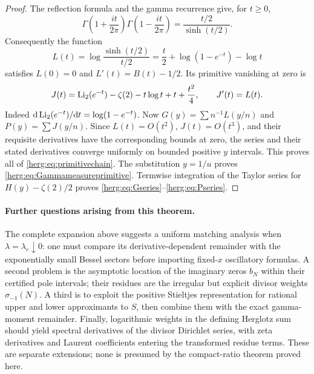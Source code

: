 \begin{proof}
The reflection formula and the gamma recurrence
\cite[\S5.5]{herg:DLMFgamma} give, for $t\geq0$,
\[
 \Gamma\left(1+\frac{it}{2\pi}\right)
 \Gamma\left(1-\frac{it}{2\pi}\right)
     =\frac{t/2}{\sinh(t/2)}.
\]
Consequently the function
\[
 L(t)=\log\frac{\sinh(t/2)}{t/2}
      =\frac t2+\log(1-e^{-t})-\log t
\]
satisfies $L(0)=0$ and $L'(t)=B(t)-1/2$. Its primitive vanishing
at zero is
\[
 J(t)=\operatorname{Li}_2(e^{-t})-\zeta(2)-t\log t+t+\frac{t^2}4,
 \qquad J'(t)=L(t).
\]
Indeed $\mathrm d\operatorname{Li}_2(e^{-t})/\mathrm dt=\log(1-e^{-t})$.
Now $G(y)=\sum n^{-1}L(y/n)$ and $P(y)=\sum J(y/n)$.
Since $L(t)=O(t^2)$, $J(t)=O(t^3)$, and their requisite
derivatives have the corresponding bounds at zero, the series and
their stated derivatives converge uniformly on bounded positive
$y$ intervals. This proves all of \eqref{herg:eq:primitivechain}.
The substitution $y=1/u$ proves
\eqref{herg:eq:Gammameasureprimitive}. Termwise integration of the
Taylor series for $H(y)-\zeta(2)/2$ proves
\eqref{herg:eq:Gseries}--\eqref{herg:eq:Pseries}.
\end{proof}

\paragraph{Further questions arising from this theorem.}
The complete expansion above suggests a uniform matching analysis when
$\lambda=\lambda_r\downarrow0$: one must compare its derivative-dependent
remainder with the exponentially small Bessel sectors before importing
fixed-$x$ oscillatory formulas. A second problem is the asymptotic
location of the imaginary zeros $b_N$ within their certified pole
intervals; their residues are the irregular but explicit divisor weights
$\sigma_{-1}(N)$. A third is to exploit the positive Stieltjes
representation for rational upper and lower approximants to $S$, then
combine them with the exact gamma-moment remainder. Finally, logarithmic
weights in the defining Herglotz sum should yield spectral derivatives
of the divisor Dirichlet series, with zeta derivatives and Laurent
coefficients entering the transformed residue terms. These are separate
extensions; none is presumed by the compact-ratio theorem proved here.

